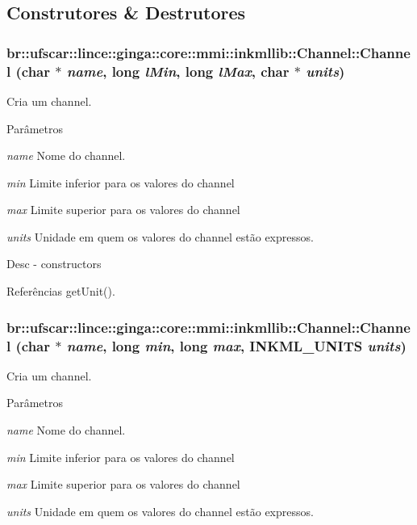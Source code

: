 \subsection{Construtores \& Destrutores}
\subsubsection[{Channel}]{\setlength{\rightskip}{0pt plus 5cm}br::ufscar::lince::ginga::core::mmi::inkmllib::Channel::Channel (char $\ast$ {\em name}, \/  long {\em lMin}, \/  long {\em lMax}, \/  char $\ast$ {\em units})}\label{classbr_1_1ufscar_1_1lince_1_1ginga_1_1core_1_1mmi_1_1inkmllib_1_1Channel_aa3e960fe2aa36a932f71aa865e05e9cb}
Cria um channel. 
\begin{DoxyParams}{Parâmetros}
\item[{\em name}]Nome do channel. \item[{\em min}]Limite inferior para os valores do channel \item[{\em max}]Limite superior para os valores do channel \item[{\em units}]Unidade em quem os valores do channel estão expressos.\end{DoxyParams}
Desc -\/ constructors 

Referências getUnit().

\subsubsection[{Channel}]{\setlength{\rightskip}{0pt plus 5cm}br::ufscar::lince::ginga::core::mmi::inkmllib::Channel::Channel (char $\ast$ {\em name}, \/  long {\em min}, \/  long {\em max}, \/  INKML\_\-UNITS {\em units})}\label{classbr_1_1ufscar_1_1lince_1_1ginga_1_1core_1_1mmi_1_1inkmllib_1_1Channel_a8e5283c07e679c8d775e27af9646d7e2}
Cria um channel. 
\begin{DoxyParams}{Parâmetros}
\item[{\em name}]Nome do channel. \item[{\em min}]Limite inferior para os valores do channel \item[{\em max}]Limite superior para os valores do channel \item[{\em units}]Unidade em quem os valores do channel estão expressos. \end{DoxyParams}
